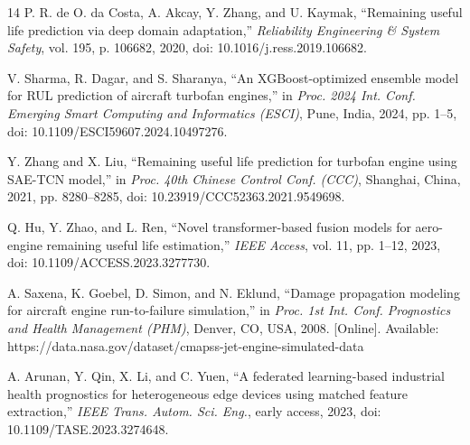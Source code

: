 \documentclass[conference]{IEEEtran}
\begin{document}
\begin{thebibliography}{14}
P. R. de O. da Costa, A. Akcay, Y. Zhang, and U. Kaymak, 
``Remaining useful life prediction via deep domain adaptation,'' 
\textit{Reliability Engineering \& System Safety}, vol. 195, p. 106682, 2020, doi: 10.1016/j.ress.2019.106682.

V. Sharma, R. Dagar, and S. Sharanya, 
``An XGBoost-optimized ensemble model for RUL prediction of aircraft turbofan engines,'' 
in \textit{Proc. 2024 Int. Conf. Emerging Smart Computing and Informatics (ESCI)}, Pune, India, 2024, pp. 1--5, doi: 10.1109/ESCI59607.2024.10497276.

Y. Zhang and X. Liu, 
``Remaining useful life prediction for turbofan engine using SAE-TCN model,'' 
in \textit{Proc. 40th Chinese Control Conf. (CCC)}, Shanghai, China, 2021, pp. 8280--8285, doi: 10.23919/CCC52363.2021.9549698.

Q. Hu, Y. Zhao, and L. Ren, 
``Novel transformer-based fusion models for aero-engine remaining useful life estimation,'' 
\textit{IEEE Access}, vol. 11, pp. 1--12, 2023, doi: 10.1109/ACCESS.2023.3277730.

A. Saxena, K. Goebel, D. Simon, and N. Eklund, 
``Damage propagation modeling for aircraft engine run-to-failure simulation,'' 
in \textit{Proc. 1st Int. Conf. Prognostics and Health Management (PHM)}, Denver, CO, USA, 2008. [Online]. Available: https://data.nasa.gov/dataset/cmapss-jet-engine-simulated-data

A. Arunan, Y. Qin, X. Li, and C. Yuen, 
``A federated learning-based industrial health prognostics for heterogeneous edge devices using matched feature extraction,'' 
\textit{IEEE Trans. Autom. Sci. Eng.}, early access, 2023, doi: 10.1109/TASE.2023.3274648.

\end{thebibliography}
\end{document}
